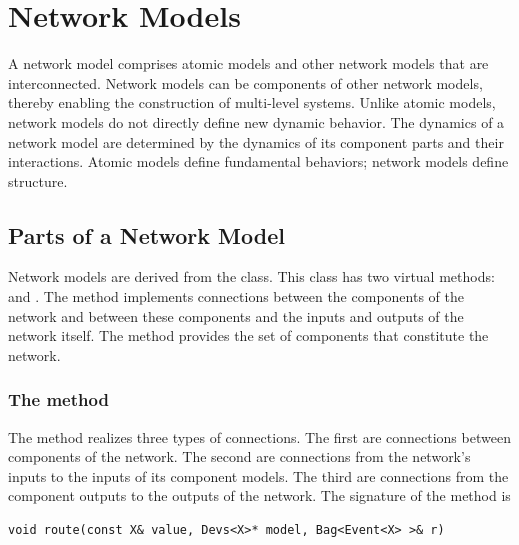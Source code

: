 \chapter{Network Models}
\label{chapter:network_models}
A network model comprises atomic models and other network models that are interconnected. Network models can be components of other network models, thereby enabling the construction of multi-level systems. Unlike atomic models, network models do not directly define new dynamic behavior. The dynamics of a network model are determined by the dynamics of its component parts and their interactions. Atomic models define fundamental behaviors; network models define structure.

\section{Parts of a Network Model}
\label{section:parts_of_a_network_model}
Network models are derived from the  class. This class has two virtual methods:  and . The  method implements connections between the components of the network and between these components and the inputs and outputs of the network itself. The  method provides the set of components that constitute the network.

\subsection{The  method}
The  method realizes three types of connections. The first are connections between components of the network. The second are connections from the network's inputs to the inputs of its component models. The third are connections from the component outputs to the outputs of the network. The signature of the  method is
\begin{verbatim}
void route(const X& value, Devs<X>* model, Bag<Event<X> >& r)
\end{verbatim}

